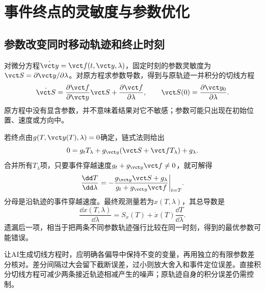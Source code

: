 \section{事件终点的灵敏度与参数优化}
\subsection{参数改变同时移动轨迹和终止时刻}
对微分方程$\dot{\vct y}=\vct f(t,\vct y,\lambda)$，固定时刻的参数灵敏度为$\vct S=\partial\vct y/\partial\lambda$。对原方程求参数导数，得到与原轨迹一并积分的切线方程
\[
 \dot{\vct S}=\frac{\partial\vct f}{\partial\vct y}\vct S
 +\frac{\partial\vct f}{\partial\lambda},\qquad
 \vct S(0)=\frac{\partial\vct y_0}{\partial\lambda}.
\]
原方程中没有显含参数，并不意味着结果对它不敏感；参数可能只出现在初始位置、速度或方向中。

若终点由$g(T,\vct y(T),\lambda)=0$确定，链式法则给出
\[0=g_tT_\lambda+g_{\vct y}(\vct S+\vct fT_\lambda)+g_\lambda.\]
合并所有$T_\lambda$项，只要事件穿越速度$g_t+g_{\vct y}\vct f\ne0$，就可解得
\[
 \frac{\dd T}{\dd\lambda}
 =-\frac{g_{\vct y}\vct S+g_\lambda}
 {g_t+g_{\vct y}\vct f}\bigg|_{t=T}.
\]
分母是沿轨迹的事件穿越速度。最终观测量若为$x(T,\lambda)$，其总导数是
\[
 \frac{\dd x(T,\lambda)}{\dd\lambda}
 =S_x(T)+\dot x(T)\frac{\dd T}{\dd\lambda}.
\]
遗漏后一项，相当于把两条不同参数轨迹强行比较在同一时刻，得到的最优参数可能错误。

让AI生成切线方程时，应明确各偏导中保持不变的变量，再用独立的有限参数差分核对。差分间隔过大会留下截断误差，过小则放大舍入和事件定位误差。直接积分切线方程可减少两条接近轨迹相减产生的噪声；原轨迹自身的积分误差仍需控制。

